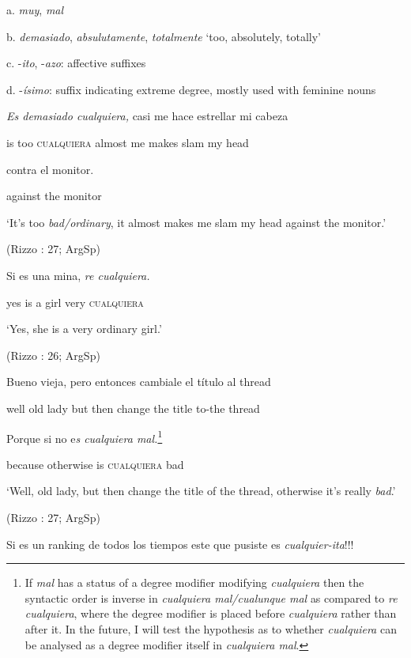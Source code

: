 \documentclass[output=paper]{langscibook}
\begin{document}
  a. \textit{muy}, \textit{mal} 

  b. \textit{demasiado}, \textit{absulutamente}, \textit{totalmente} ‘too, absolutely, totally’

  c. -\textit{ito}, -\textit{azo}: affective suffixes 

  d. -\textit{ísimo}: suffix indicating extreme degree, mostly used with feminine nouns

  \textit{Es  demasiado  cualquiera,}  casi  me  hace  estrellar  mi  cabeza

  is  too  \textsc{cualquiera}  almost me makes slam  my  head

  contra  el  monitor.            

  against  the  monitor            

  ‘It’s too \textit{bad/ordinary}, it almost makes me slam my head against the monitor.’

  (Rizzo \citealt{Salierno2013}: 27; ArgSp)

  Si  es  una  mina,  \textit{re  cualquiera.}

  yes  is  a  girl  very  \textsc{cualquiera}

  ‘Yes, she is a very ordinary girl.’

  (Rizzo \citealt{Salierno2013}: 26; ArgSp)

  Bueno   vieja,  pero  entonces  cambiale  el  título  al  thread

  well  old lady  but  then  change  the  title  to-the  thread

  Porque  si  no  e\textit{s  cualquiera  mal.}\footnote{ \textrm{If} \textrm{\textit{mal}} \textrm{has a status of a degree modifier modifying} \textrm{\textit{cualquiera}} \textrm{then the syntactic order is inverse in} \textrm{\textit{cualquiera mal/cualunque mal}} \textrm{as compared to} \textrm{\textit{re cualquiera}}\textrm{, where the degree modifier is placed before} \textrm{\textit{cualquiera}} \textrm{rather than after it. In the future, I will test the hypothesis as to whether} \textrm{\textit{cualquiera}} \textrm{can be analysed as a degree modifier itself in} \textrm{\textit{cualquiera mal}}. }

  because  otherwise  is  \textsc{cualquiera} bad

  ‘Well, old lady, but then change the title of the thread, otherwise it’s really \textit{bad}.’

  (Rizzo \citealt{Salierno2013}: 27; ArgSp)

  Si  es  un  ranking  de  todos  los  tiempos  este  que  pusiste  es  \textit{cualquier-ita}!!!
\end{document}
